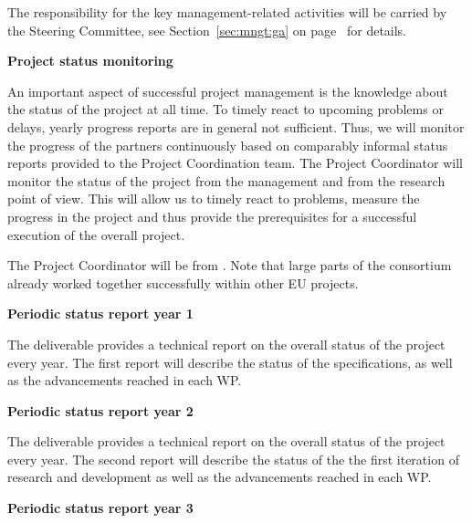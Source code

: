 {\begin{tasks}{\WPManagementNo}
The responsibility for the key management-related activities will be carried by the \Project{} Steering Committee, see Section~\ref{sec:mngt:ga} on page~\pageref{sec:mngt:ga} for details.


\item {\bf Project status monitoring}
\label{task:wpmanagement:monitoring}

An important aspect of successful project management is the knowledge about the status of the project at all time. To timely react to upcoming problems or delays, yearly progress reports are in general not sufficient. Thus, we will monitor the progress of the partners continuously based on comparably informal status reports provided to the Project Coordination team.  The Project Coordinator will monitor the status of the project from the
management and from the research point of view.
This will allow us to timely react to problems, measure the progress in the \Project{} project and thus provide the prerequisites for a successful execution of the overall project.

The Project Coordinator will be \Coordinator{} from \COORD{}. Note that large parts of the \Project consortium already worked together successfully within other EU projects.
\end{tasks}


\begin{deliverables}{\WPManagementNo}

\item {\bf  Periodic status report year 1} 
	\delresponsible{\VW}

The deliverable provides a technical report on the overall status of the project every year. The first report will describe the status of the specifications, as well as the advancements reached in each WP. 

\item {\bf  Periodic status report year 2} 
	\delresponsible{\VW}

The deliverable provides a technical report on the overall status of the project every year. The second report will describe the status of the the first iteration of research and development as well as the advancements reached in each WP.

\item {\bf  Periodic status report year 3} 
	\delresponsible{\VW}


\end{deliverables}}
